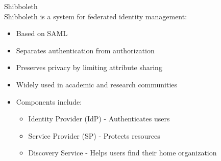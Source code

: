 \begin{concept}{Shibboleth}\\
Shibboleth is a system for federated identity management:
\begin{itemize}
    \item Based on SAML
    \item Separates authentication from authorization
    \item Preserves privacy by limiting attribute sharing
    \item Widely used in academic and research communities
    \item Components include:
    \begin{itemize}
        \item Identity Provider (IdP) - Authenticates users
        \item Service Provider (SP) - Protects resources
        \item Discovery Service - Helps users find their home organization
    \end{itemize}
\end{itemize}
\end{concept}


